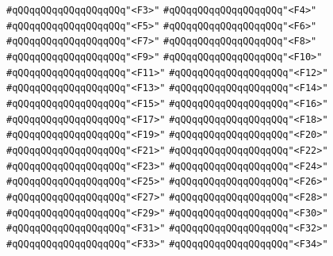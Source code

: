 \verb|#qQQqqQQqqQQqqQQqqQQq"<F3>"|\newline
\verb|#qQQqqQQqqQQqqQQqqQQq"<F4>"|\newline
\verb|#qQQqqQQqqQQqqQQqqQQq"<F5>"|\newline
\verb|#qQQqqQQqqQQqqQQqqQQq"<F6>"|\newline
\verb|#qQQqqQQqqQQqqQQqqQQq"<F7>"|\newline
\verb|#qQQqqQQqqQQqqQQqqQQq"<F8>"|\newline
\verb|#qQQqqQQqqQQqqQQqqQQq"<F9>"|\newline
\verb|#qQQqqQQqqQQqqQQqqQQq"<F10>"|\newline
\verb|#qQQqqQQqqQQqqQQqqQQq"<F11>"|\newline
\verb|#qQQqqQQqqQQqqQQqqQQq"<F12>"|\newline
\verb|#qQQqqQQqqQQqqQQqqQQq"<F13>"|\newline
\verb|#qQQqqQQqqQQqqQQqqQQq"<F14>"|\newline
\verb|#qQQqqQQqqQQqqQQqqQQq"<F15>"|\newline
\verb|#qQQqqQQqqQQqqQQqqQQq"<F16>"|\newline
\verb|#qQQqqQQqqQQqqQQqqQQq"<F17>"|\newline
\verb|#qQQqqQQqqQQqqQQqqQQq"<F18>"|\newline
\verb|#qQQqqQQqqQQqqQQqqQQq"<F19>"|\newline
\verb|#qQQqqQQqqQQqqQQqqQQq"<F20>"|\newline
\verb|#qQQqqQQqqQQqqQQqqQQq"<F21>"|\newline
\verb|#qQQqqQQqqQQqqQQqqQQq"<F22>"|\newline
\verb|#qQQqqQQqqQQqqQQqqQQq"<F23>"|\newline
\verb|#qQQqqQQqqQQqqQQqqQQq"<F24>"|\newline
\verb|#qQQqqQQqqQQqqQQqqQQq"<F25>"|\newline
\verb|#qQQqqQQqqQQqqQQqqQQq"<F26>"|\newline
\verb|#qQQqqQQqqQQqqQQqqQQq"<F27>"|\newline
\verb|#qQQqqQQqqQQqqQQqqQQq"<F28>"|\newline
\verb|#qQQqqQQqqQQqqQQqqQQq"<F29>"|\newline
\verb|#qQQqqQQqqQQqqQQqqQQq"<F30>"|\newline
\verb|#qQQqqQQqqQQqqQQqqQQq"<F31>"|\newline
\verb|#qQQqqQQqqQQqqQQqqQQq"<F32>"|\newline
\verb|#qQQqqQQqqQQqqQQqqQQq"<F33>"|\newline
\verb|#qQQqqQQqqQQqqQQqqQQq"<F34>"|\newline
